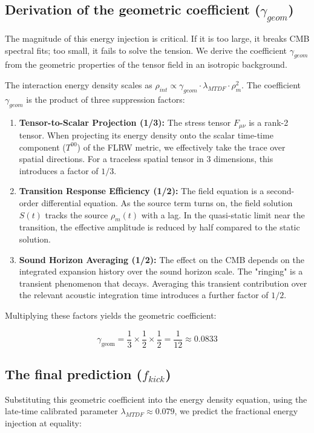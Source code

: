 \documentclass[11pt,a4paper]{article}
\begin{document}
\subsection{Derivation of the geometric coefficient ($\gamma_{geom}$)}
The magnitude of this energy injection is critical. If it is too large, it breaks CMB spectral fits; too small, it fails to solve the tension. We derive the coefficient $\gamma_{geom}$ from the geometric properties of the tensor field in an isotropic background.

The interaction energy density scales as $\rho_{int} \propto \gamma_{geom} \cdot \lambda_{MTDF} \cdot \rho_m^2$. The coefficient $\gamma_{geom}$ is the product of three suppression factors:

\begin{enumerate}
  \item \textbf{Tensor-to-Scalar Projection (1/\allowbreak{}3):} The stress tensor $F_{\mu\nu}$ is a rank-2 tensor. When projecting its energy density onto the scalar time-time component ($T^{00}$) of the FLRW metric, we effectively take the trace over spatial directions. For a traceless spatial tensor in 3 dimensions, this introduces a factor of $1/3$.
  \item \textbf{Transition Response Efficiency (1/\allowbreak{}2):} The field equation is a second-order differential equation. As the source term turns on, the field solution $S(t)$ tracks the source $\rho_m(t)$ with a lag. In the quasi-static limit near the transition, the effective amplitude is reduced by half compared to the static solution.
  \item \textbf{Sound Horizon Averaging (1/\allowbreak{}2):} The effect on the CMB depends on the integrated expansion history over the sound horizon scale. The "ringing" is a transient phenomenon that decays. Averaging this transient contribution over the relevant acoustic integration time introduces a further factor of $1/2$.
\end{enumerate}

Multiplying these factors yields the geometric coefficient:

$$ \gamma_{\text{geom}} = \frac{1}{3} \times \frac{1}{2} \times \frac{1}{2} = \frac{1}{12} \approx 0.0833 $$

\subsection{The final prediction ($f_{kick}$)}
Substituting this geometric coefficient into the energy density equation, using the late-time calibrated parameter $\lambda_{MTDF} \approx 0.079$, we predict the fractional energy injection at equality:
\end{document}
